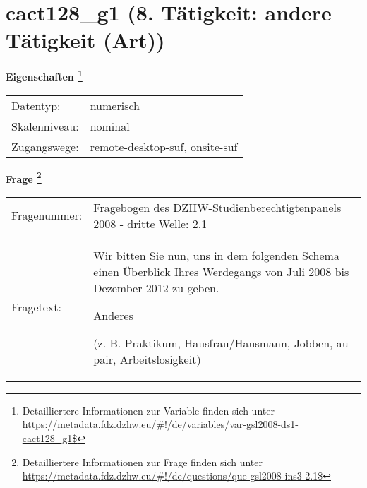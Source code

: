 
    \setcounter{footnote}{0}

    \vspace*{-1.8cm}
	\section{cact128\_g1 (8. Tätigkeit: andere Tätigkeit (Art))}
	\label{section:cact128_g1}



    \vspace*{0.5cm}
    \noindent\textbf{Eigenschaften
	\footnote{Detailliertere Informationen zur Variable finden sich unter
		\url{https://metadata.fdz.dzhw.eu/\#!/de/variables/var-gsl2008-ds1-cact128_g1$}}}\\
	\begin{tabularx}{\hsize}{@{}lX}
	Datentyp: & numerisch \\
	Skalenniveau: & nominal \\
	Zugangswege: &
	  remote-desktop-suf, 
	  onsite-suf
 \\
    \end{tabularx}



				\vspace*{0.5cm}
                \noindent\textbf{Frage
	                \footnote{Detailliertere Informationen zur Frage finden sich unter
		              \url{https://metadata.fdz.dzhw.eu/\#!/de/questions/que-gsl2008-ins3-2.1$}}}\\
				\begin{tabularx}{\hsize}{@{}lX}
					Fragenummer: &
					  Fragebogen des DZHW-Studienberechtigtenpanels 2008 - dritte Welle:
					  2.1
 \\
					Fragetext: & Wir bitten Sie nun, uns in dem folgenden Schema einen Überblick Ihres Werdegangs von Juli 2008 bis Dezember 2012 zu geben.\par  Anderes\par  (z. B. Praktikum, Hausfrau/Hausmann, Jobben, au pair, Arbeitslosigkeit) \\
				\end{tabularx}





